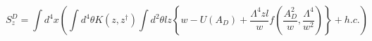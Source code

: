 \begin{equation}
S_z^D=\int d^4 x \left(\int d^4 \theta K(z,z^{\dagger})\int d^2 \theta l z \left\{w-U(A_D)+\frac{\Lambda^4 zl}{w}f\left( \frac{A_D^2}{w},\frac{\Lambda^4 }{w^2}\right) \right\}+h.c.\right)
\end{equation}

